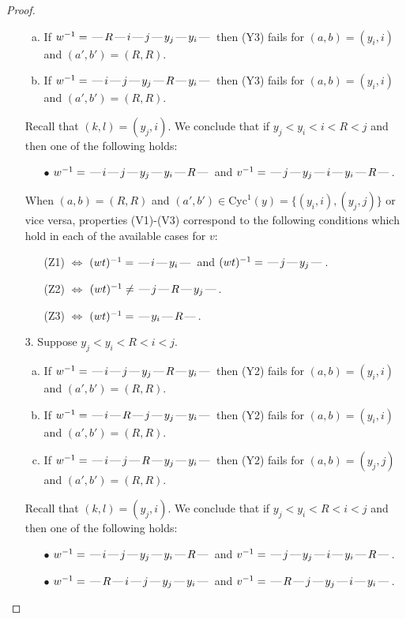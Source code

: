 \documentclass[10pt]{article}
\theoremstyle{definition}
\theoremstyle{definition}
\def\dash{\text{\hspace{0.5mm}---\hspace{0.5mm}}}
\def\Cyc{\mathrm{Cyc}}
\begin{document}
\begin{proof}
\begin{enumerate}
\begin{enumerate}[(a)]
\item If $w^{-1} = \dash R\dash i\dash j\dash y_j\dash y_i\dash $ then (Y3) fails for $(a,b)=(y_i,i)$ and $(a',b')=(R,R)$.
\item If $w^{-1} = \dash i\dash j\dash y_j\dash R\dash y_i\dash $ then (Y3) fails for $(a,b)=(y_i,i)$ and $(a',b')=(R,R)$.
\end{enumerate}
Recall that $(k,l) = (y_j,i)$.
We conclude that if $y_j < y_i < i < R < j$ and then one of the following holds:
\begin{enumerate}
\item[$\bullet$] $w^{-1} = \dash i\dash j\dash y_j\dash y_i\dash R\dash $ and $v^{-1} = \dash j\dash y_j\dash i\dash y_i\dash R\dash $.
\end{enumerate}
When $(a,b)= (R, R)$ and $(a',b')\in \Cyc^1(y)=\{(y_i,i),(y_j,j)\}$ or vice versa,
properties (V1)-(V3) correspond to the following conditions which hold in
each of the available cases for $v$:
\begin{enumerate}
\item[](Z1) $\Leftrightarrow$ $(wt)^{-1} = \dash i \dash y_i \dash$  and $(wt)^{-1} = \dash j \dash y_j \dash$.
\item[](Z2) $\Leftrightarrow$ $(wt)^{-1} \neq \dash j \dash R \dash y_j \dash$.
\item[](Z3) $\Leftrightarrow$ $(wt)^{-1} = \dash y_i \dash R \dash$.
\end{enumerate}
\item[$3$.] Suppose $y_j < y_i < R < i < j$.
\begin{enumerate}[(a)]
\item If $w^{-1} = \dash i\dash j\dash y_j\dash R\dash y_i\dash $ then (Y2) fails for $(a,b)=(y_i,i)$ and $(a',b')=(R,R)$.
\item If $w^{-1} = \dash i\dash R\dash j\dash y_j\dash y_i\dash $ then (Y2) fails for $(a,b)=(y_i,i)$ and $(a',b')=(R,R)$.
\item If $w^{-1} = \dash i\dash j\dash R\dash y_j\dash y_i\dash $ then (Y2) fails for $(a,b)=(y_j,j)$ and $(a',b')=(R,R)$.
\end{enumerate}
Recall that $(k,l) = (y_j,i)$.
We conclude that if $y_j < y_i < R < i < j$ and then one of the following holds:
\begin{enumerate}
\item[$\bullet$] $w^{-1} = \dash i\dash j\dash y_j\dash y_i\dash R\dash $ and $v^{-1} = \dash j\dash y_j\dash i\dash y_i\dash R\dash $.
\item[$\bullet$] $w^{-1} = \dash R\dash i\dash j\dash y_j\dash y_i\dash $ and $v^{-1} = \dash R\dash j\dash y_j\dash i\dash y_i\dash $.

\end{enumerate}
\end{enumerate}
\end{proof}
\end{document}
